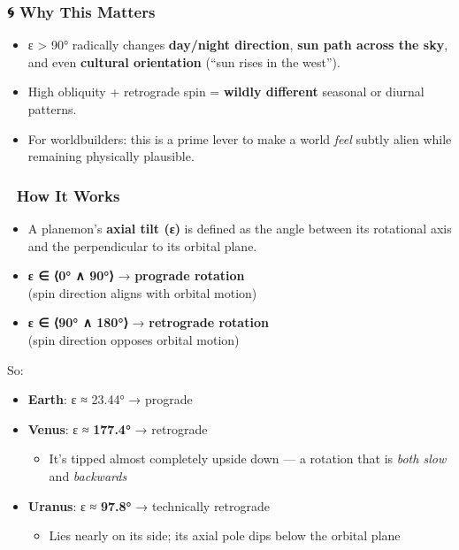 \documentclass[
  letterpaper,
]{book}
\providecommand{\tightlist}{%
  \setlength{\itemsep}{0pt}\setlength{\parskip}{0pt}}
\begin{document}
\subsubsection{🌀 Why This Matters}\label{why-this-matters}

\begin{itemize}
\tightlist
\item
  ε \textgreater{} 90° radically changes \textbf{day/night direction},
  \textbf{sun path across the sky}, and even \textbf{cultural
  orientation} (``sun rises in the west'').
\item
  High obliquity + retrograde spin = \textbf{wildly different} seasonal
  or diurnal patterns.
\item
  For worldbuilders: this is a prime lever to make a world \emph{feel}
  subtly alien while remaining physically plausible.
\end{itemize}

\subsubsection{\texorpdfstring{🧭 \textbf{How It
Works}}{🧭 How It Works}}\label{how-it-works}

\begin{itemize}
\tightlist
\item
  A planemon's \textbf{axial tilt (ε)} is defined as the angle between
  its rotational axis and the perpendicular to its orbital plane.
\item
  \textbf{ε ∈ ⟨0° ∧ 90°⟩} → \textbf{prograde rotation}\\
  (spin direction aligns with orbital motion)
\item
  \textbf{ε ∈ ⟨90° ∧ 180°⟩} → \textbf{retrograde rotation}\\
  (spin direction opposes orbital motion)
\end{itemize}

So:

\begin{itemize}
\tightlist
\item
  \textbf{Earth}: ε ≈ 23.44° → prograde
\item
  \textbf{Venus}: ε ≈ \textbf{177.4°} → retrograde

  \begin{itemize}
  \tightlist
  \item
    It's tipped almost completely upside down --- a rotation that is
    \emph{both slow} and \emph{backwards}
  \end{itemize}
\item
  \textbf{Uranus}: ε ≈ \textbf{97.8°} → technically retrograde

  \begin{itemize}
  \tightlist
  \item
    Lies nearly on its side; its axial pole dips below the orbital plane
  \end{itemize}
\end{itemize}
\end{document}

